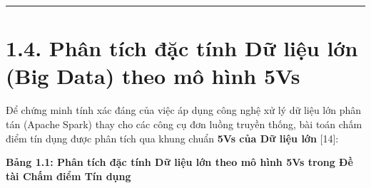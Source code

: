 \documentclass[
  13pt,
  a4paper,
]{report}
\begin{document}
\begin{center}\rule{0.5\linewidth}{0.5pt}\end{center}

\section{1.4. Phân tích đặc tính Dữ liệu lớn (Big Data) theo mô hình
5Vs}\label{phuxe2n-tuxedch-ux111ux1eb7c-tuxednh-dux1eef-liux1ec7u-lux1edbn-big-data-theo-muxf4-huxecnh-5vs}

Để chứng minh tính xác đáng của việc áp dụng công nghệ xử lý dữ liệu lớn
phân tán (Apache Spark) thay cho các công cụ đơn luồng truyền thống, bài
toán chấm điểm tín dụng được phân tích qua khung chuẩn \textbf{5Vs của
Dữ liệu lớn} {[}14{]}:

\textbf{Bảng 1.1: Phân tích đặc tính Dữ liệu lớn theo mô hình 5Vs trong
Đề tài Chấm điểm Tín dụng}
\end{document}
